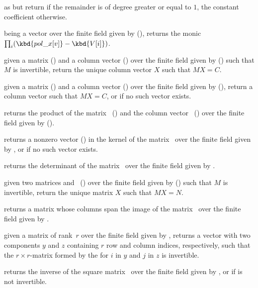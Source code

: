  as 
but return  if the remainder is of degree greater or equal to $1$,
the constant coefficient otherwise.

 being a vector over the finite field given by  (),
returns the monic  $\prod_i (\kbd{pol\_x[v]} - \kbd{V[i]})$.


 given a matrix 
() and a column vector  () over the finite
field given by  () such that $M$ is invertible,
return the unique column vector $X$ such that $MX=C$.

 given a matrix
 () and a column vector  () over the
finite field given by  (), return a column vector
 such that $MX=C$, or  if no such vector exists.

 returns the product of
the matrix~ () and the column vector~
() over the finite field given by  ().

 returns a nonzero vector
() in the kernel of the matrix~ over the finite field
given by , or  if no such vector exists.

 returns the determinant of the
matrix~ over the finite field given by .

 given two matrices 
and~ () over the finite field given by 
() such that $M$ is invertible, return the unique matrix
$X$ such that $MX=N$.

 returns a matrix whose columns
span the image of the matrix~ over the finite field given by
.

 given a matrix  of
rank~$r$ over the finite field given by , returns a vector
with two  components $y$ and $z$ containing $r$ row and
column indices, respectively, such that the $r\times r$-matrix formed
by the  for $i$ in $y$ and $j$ in $z$ is invertible.

 returns the inverse of the square
matrix~ over the finite field given by , or 
if  is not invertible.

